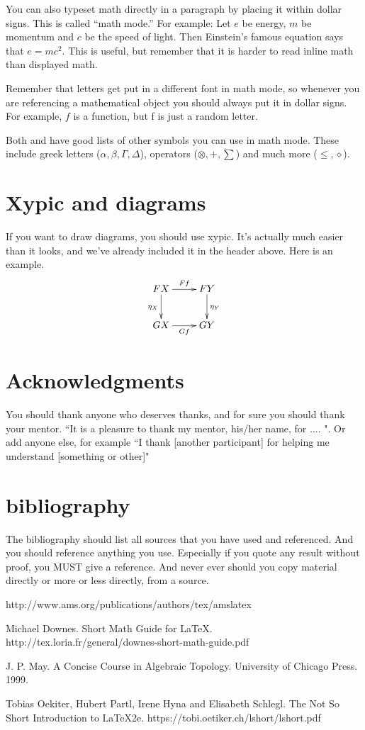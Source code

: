 \documentclass[psamsfonts]{amsart}
\theoremstyle{definition}
\theoremstyle{remark}
\numberwithin{equation}{section}
\begin{document}
You can also typeset math directly in a paragraph by placing it within
dollar signs.  This is called ``math mode.''  For example: Let $e$
be energy, $m$ be momentum and $c$ be the speed of light.  Then
Einstein's famous equation says that $e=mc^2$.  This is useful, but
remember that it is harder to read inline math than displayed math. 

Remember that letters get put in a different font in math mode, so
whenever you are referencing a mathematical object you should always
put it in dollar signs.  For example, $f$ is a function, but f is just
a random letter.

Both \cite{notsoshort} and \cite{amsshort} have good lists of other symbols you can use in math mode.
These include greek letters ($\alpha, \beta, \Gamma, \Delta$),
operators ($\otimes, +, \sum$) and much more ($\leq, \diamond$).

\section{Xypic and diagrams}

If you want to draw diagrams, you should use xypic.  It's actually
much easier than it looks, and we've already included it in the header
above.  Here is an example. 
\[\xymatrix{
FX \ar[r]^-{Ff} \ar[d]_{\eta_X} & FY \ar[d]^{\eta_Y} \\
GX \ar[r]_-{Gf} & GY\\} \]

\section*{Acknowledgments}  You should thank anyone who deserves thanks, and for sure you should
thank your mentor.   ``It is a pleasure to thank my mentor, 
his/her name, for ....  ".   Or add anyone else, for example ``I thank [another participant] for helping 
me understand [something or other]"

\section{bibliography}  The bibliography should list all sources that you have used and referenced.
And you should reference anything you use.   Especially if you quote any result without proof, you MUST
give a reference.   And never ever should you copy material directly or more or less directly, from a source.

\begin{thebibliography}{9}

 http://www.ams.org/publications/authors/tex/amslatex

Michael Downes.
Short Math Guide for \LaTeX.
http://tex.loria.fr/general/downes-short-math-guide.pdf

J. P. May.
A Concise Course in Algebraic Topology.
University of Chicago Press. 1999. 

Tobias Oekiter, Hubert Partl, Irene Hyna and Elisabeth Schlegl.
The Not So Short Introduction to \LaTeX 2e.
https://tobi.oetiker.ch/lshort/lshort.pdf

\end{thebibliography}
\end{document}
